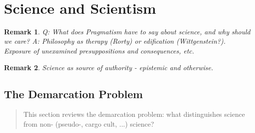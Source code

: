 \documentclass[11pt,twoside]{article}
\newtheorem{remark}{Remark}
\begin{document}
\cite{maynard_diversity_1991} \\
\cite{maynard_toward_2000} \\
\cite{price_true_question_1983} \\
\cite{price_expressivism_2013} \\
\cite{price_naturalism_2013} \\
\cite{price_pluralism_2013} \\
\cite{price_two_2013} \\
\cite{putnam_representation_1991} \\
\cite{putnam_collapse_2002} \\
\cite{putnam_three_2009} \\
\cite{rorty_method_1981} \\
\cite{rorty_representation_1988} \\
\cite{rorty_pmn} \\
\cite{schatzki_practice_2001} \\
\cite{sellars_empiricism_1997} \\
\cite{tate_foucault_2007} \\
\cite{weiss_reading_2009} \\
\cite{winship_ethnomethodology_2010} \\
\cite{zimmerman_review_1994}

\section{Science and Scientism}

\begin{remark}
  Q: What does Pragmatism have to say about science, and why should we
  care?  A: Philosophy as therapy (Rorty) or edification
  (Wittgenstein?).  Exposure of unexamined presuppositions and
  consequences, etc.
\end{remark}

\begin{remark}
  Science as source of \textit{authority} -  epistemic and otherwise. 
\end{remark}

\subsection{The Demarcation Problem}

\begin{abstract}
  This section reviews the demarcation problem: what distinguishes
  science from non- (pseudo-, cargo cult, ...) science?
\end{abstract}
\end{document}
